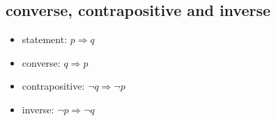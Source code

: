 \documentclass{article}
\begin{document}
\subsection{converse, contrapositive and inverse}

\begin{itemize}
    \item statement: $p \Rightarrow  q$
    \item converse: $q \Rightarrow p$
    \item contrapositive: $\lnot q \Rightarrow \lnot p$
    \item inverse: $\lnot p \Rightarrow \lnot q$
\end{itemize}
\end{document}
